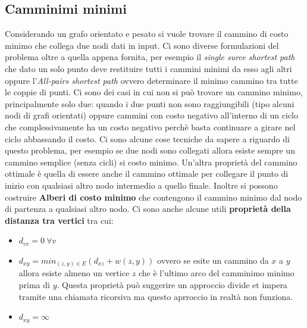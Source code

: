 \documentclass{article}
\begin{document}
\subsection{Camminimi minimi}
Considerando un grafo orientato e pesato si vuole trovare il cammino di costo minimo che collega due nodi dati in input. Ci sono diverse formulazioni del problema oltre a quella appena fornita, per esempio il \textit{single surce shortest path} che dato un solo punto deve restituire tutti i cammini minimi da esso agli altri oppure l'\textit{All-pairs shortest path} ovvero determinare il minimo cammino tra tutte le coppie di punti.
Ci sono dei casi in cui  non si può trovare un cammino minimo, principalmente solo due: quando i due punti non sono raggiungibili (tipo alcuni nodi di grafi orientati) oppure cammini con costo negativo all'interno di un ciclo che complessivamente ha un costo negativo perchè basta continuare a girare nel ciclo abbassando il costo. 
Ci sono alcune cose tecniche da sapere a riguardo di questo problema, per esempio se due nodi sono collegati allora esiste sempre un cammino semplice (senza cicli) si costo minimo.
Un'altra proprietà del cammino ottimale è quella di essere anche il cammino ottimale per collegare il punto di inizio con qualsiasi altro nodo intermedio a quello finale.
Inoltre si possono costruire \textbf{Alberi di costo minimo} che contengono il cammino minimo dal nodo di partenza a qualsiasi altro nodo. 
Ci sono anche alcune utili \textbf{proprietà della distanza tra vertici} tra cui:
\begin{itemize}
    \item $d_{vv} = 0 \   \forall v$
    \item $d_{xy} = min_{(z,y) \in E} (d_{xz}+w(z,y))$ ovvero se esite un cammino da $x$ a $y$ allora esiste almeno un vertice $z$ che è l'ultimo arco del camminimo minimo prima di $y$.
    Questa proprietà può suggerire un approccio divide et impera tramite una chiamata ricorsiva ma questo aprroccio in realtà non funziona.
    \item $d_{xy} = \infty$
\end {itemize}
\end{document}
